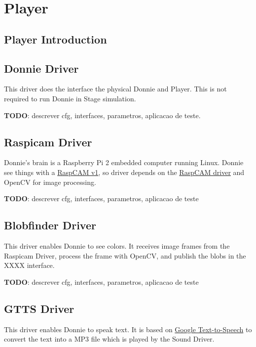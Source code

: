 
\chapter{Player}

\section{Player Introduction}
\label{sec:player_intro}


\section{Donnie Driver}
\label{sec:player_donnie}

This driver does the interface the physical Donnie and Player. This is not required to run Donnie in Stage simulation.

{\bf TODO}: descrever cfg, interfaces, parametros, aplicacao de teste.


\section{Raspicam Driver}
\label{sec:player_raspicam}

Donnie's brain is a Raspberry Pi 2 embedded computer running Linux. Donnie see things with a \href{https://www.raspberrypi.org/documentation/hardware/camera/README.md}{RaspCAM v1}, so driver depends on the \href{https://www.raspberrypi.org/documentation/raspbian/applications/camera.md}{RaspCAM driver} and OpenCV for image processing. 

{\bf TODO}: descrever cfg, interfaces, parametros, aplicacao de teste


\section{Blobfinder Driver}
\label{sec:player_blob}

This driver enables Donnie to see colors. It receives image frames from the Raspicam Driver, process the frame with OpenCV, and publish the blobs in the XXXX interface.

{\bf TODO}: descrever cfg, interfaces, parametros, aplicacao de teste

\section{GTTS Driver}
\label{sec:player_gtts}

This driver enables Donnie to speak text. It is based on \href{https://en.wikipedia.org/wiki/Google_Text-to-Speech}{Google Text-to-Speech} to convert the text into a MP3 file which is played by the Sound Driver. 


